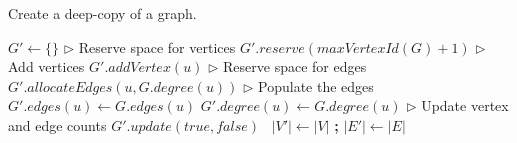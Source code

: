 \begin{algorithm}[hbtp]
\caption{Create a deep-copy of a graph.}
\label{alg:clone}
\begin{algorithmic}[1]

\Statex

  \State $G' \gets \{\}$ \label{alg:clone--init}
  \State $\rhd$ Reserve space for vertices
  \State $G'.reserve(maxVertexId(G) + 1)$ \label{alg:clone--reserve-vertices}
  \State $\rhd$ Add vertices
   \label{alg:clone--add-vertices-begin}
    \State $G'.addVertex(u)$
  \EndFor \label{alg:clone--add-vertices-end}
  \State $\rhd$ Reserve space for edges
   \label{alg:clone--reserve-edges-begin}
    \State $G'.allocateEdges(u, G.degree(u))$
  \EndFor \label{alg:clone--reserve-edges-end}
  \State $\rhd$ Populate the edges
   \label{alg:clone--populate-edges-begin}
    \State $G'.edges(u) \gets G.edges(u)$
    \State $G'.degree(u) \gets G.degree(u)$
  \EndFor \label{alg:clone--populate-edges-end}
  \State $\rhd$ Update vertex and edge counts
   $G'.update(true, false)$ \label{alg:clone--update-counts-csr}
  \Else\ $|V'| \gets |V|$ \textbf{;} $|E'| \gets |E|$ \label{alg:clone--update-counts-noncsr}
  \EndIf
   \label{alg:clone--return}
\EndFunction
\end{algorithmic}
\end{algorithm}

